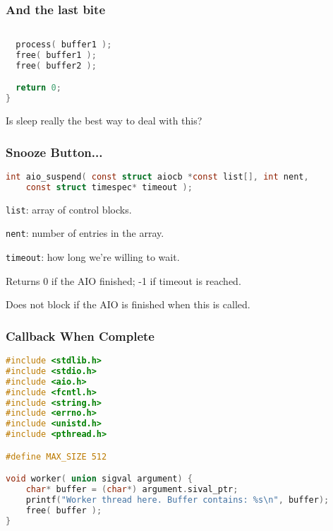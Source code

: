 \begin{frame}[fragile]
	\frametitle{And the last bite}

	\begin{lstlisting}[language=C]
  
  process( buffer1 );
  free( buffer1 );
  free( buffer2 );

  return 0;
}
\end{lstlisting}

	Is sleep really the best way to deal with this?

\end{frame}


\begin{frame}[fragile]
	\frametitle{Snooze Button...}
	\begin{lstlisting}[language=C]
int aio_suspend( const struct aiocb *const list[], int nent, 
    const struct timespec* timeout );
\end{lstlisting}

	\texttt{list}: array of control blocks.

	\texttt{nent}: number of entries in the array.

	\texttt{timeout}: how long we're willing to wait.

	Returns 0 if the AIO finished; -1 if timeout is reached.

	Does not block if the AIO is finished when this is called.

\end{frame}


\begin{frame}[fragile]
	\frametitle{Callback When Complete}

	\begin{lstlisting}[language=C]
#include <stdlib.h>
#include <stdio.h>
#include <aio.h>
#include <fcntl.h>
#include <string.h>
#include <errno.h>
#include <unistd.h>
#include <pthread.h>

#define MAX_SIZE 512

void worker( union sigval argument) {
    char* buffer = (char*) argument.sival_ptr;
    printf("Worker thread here. Buffer contains: %s\n", buffer);
    free( buffer );
}
\end{lstlisting}

\end{frame}


